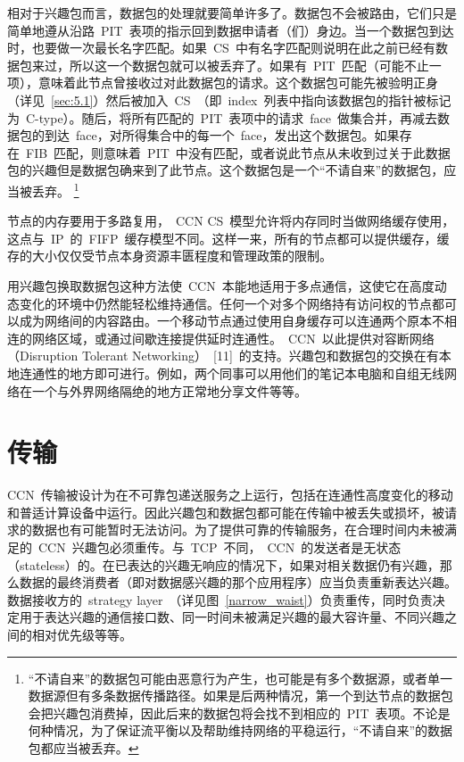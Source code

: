 相对于兴趣包而言，数据包的处理就要简单许多了。数据包不会被路由，它们只是简单地遵从沿路~PIT~表项的指示回到数据申请者（们）身边。当一个数据包到达时，也要做一次最长名字匹配。如果~CS~中有名字匹配则说明在此之前已经有数据包来过，所以这一个数据包就可以被丢弃了。如果有~PIT~匹配（可能不止一项），意味着此节点曾接收过对此数据包的请求。这个数据包可能先被验明正身（详见~\ref{sec:5.1}）然后被加入~CS~（即~index~列表中指向该数据包的指针被标记为~C-type）。随后，将所有匹配的~PIT~表项中的请求~face~做集合并，再减去数据包的到达~face，对所得集合中的每一个~face，发出这个数据包。如果存在~FIB~匹配，则意味着~PIT~中没有匹配，或者说此节点从未收到过关于此数据包的兴趣但是数据包确来到了此节点。这个数据包是一个“不请自来”的数据包，应当被丢弃。
\renewcommand\baselinestretch{1} %
\footnote{“不请自来”的数据包可能由恶意行为产生，也可能是有多个数据源，或者单一数据源但有多条数据传播路径。如果是后两种情况，第一个到达节点的数据包会把兴趣包消费掉，因此后来的数据包将会找不到相应的~PIT~表项。不论是何种情况，为了保证流平衡以及帮助维持网络的平稳运行，“不请自来”的数据包都应当被丢弃。}

节点的内存要用于多路复用，~CCN CS~模型允许将内存同时当做网络缓存使用，这点与~IP~的~FIFP~缓存模型不同。这样一来，所有的节点都可以提供缓存，缓存的大小仅仅受节点本身资源丰匮程度和管理政策的限制。

用兴趣包换取数据包这种方法使~CCN~本能地适用于多点通信，这使它在高度动态变化的环境中仍然能轻松维持通信。任何一个对多个网络持有访问权的节点都可以成为网络间的内容路由。一个移动节点通过使用自身缓存可以连通两个原本不相连的网络区域，或通过间歇连接提供延时连通性。~CCN~以此提供对容断网络（Disruption Tolerant Networking）~[11]~的支持。兴趣包和数据包的交换在有本地连通性的地方即可进行。例如，两个同事可以用他们的笔记本电脑和自组无线网络在一个与外界网络隔绝的地方正常地分享文件等等。

\section{传输}
\label{sec:3}
CCN~传输被设计为在不可靠包递送服务之上运行，包括在连通性高度变化的移动和普适计算设备中运行。因此兴趣包和数据包都可能在传输中被丢失或损坏，被请求的数据也有可能暂时无法访问。为了提供可靠的传输服务，在合理时间内未被满足的~CCN~兴趣包必须重传。与~TCP~不同，~CCN~的发送者是无状态（stateless）的。在已表达的兴趣无响应的情况下，如果对相关数据仍有兴趣，那么数据的最终消费者（即对数据感兴趣的那个应用程序）应当负责重新表达兴趣。数据接收方的~strategy layer~（详见图~\ref{narrow_waist}）负责重传，同时负责决定用于表达兴趣的通信接口数、同一时间未被满足兴趣的最大容许量、不同兴趣之间的相对优先级等等。%

